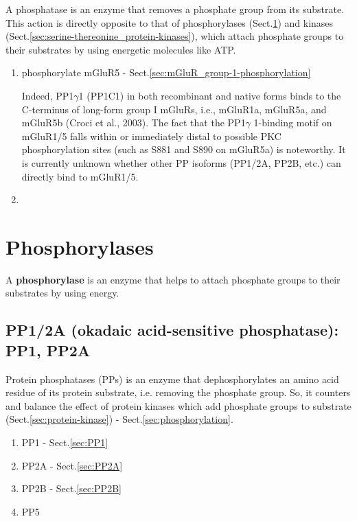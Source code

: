 A phosphatase is an enzyme that removes a phosphate group from its substrate.
This action is directly opposite to that of phosphorylases
(Sect.\ref{sec:phosphorylases}) and kinases
(Sect.\ref{sec:serine-thereonine_protein-kinases}), which attach phosphate
groups to their substrates by using energetic molecules like ATP.
\begin{enumerate}
  \item phosphorylate mGluR5 - Sect.\ref{sec:mGluR_group-1-phosphorylation}
 
Indeed, PP1$\gamma$1 (PP1C1) in both recombinant and native forms binds to the
C-terminus of long-form group I mGluRs, i.e., mGluR1a, mGluR5a, and mGluR5b
(Croci et al., 2003).
The fact that the PP1$\gamma$ 1-binding motif on mGluR1/5 falls within or
immediately distal to possible PKC phosphorylation sites (such as S881 and S890
on mGluR5a) is noteworthy. It is currently unknown whether other PP isoforms
(PP1/2A, PP2B, etc.) can directly bind to mGluR1/5.
 
  \item 
\end{enumerate}

\section{Phosphorylases}
\label{sec:phosphorylases}

A {\bf phosphorylase} is an enzyme that helps to attach phosphate groups to
their substrates by using energy.


\subsection{PP1/2A (okadaic acid-sensitive phosphatase): PP1, PP2A}
\label{sec:protein-phosphatase}

Protein phosphatases (PPs) is an enzyme that dephosphorylates an amino acid
residue of its protein substrate, i.e. removing the phosphate group. So, it
counters and balance the effect of protein kinases which add phosphate groups to
substrate (Sect.\ref{sec:protein-kinase}) - Sect.\ref{sec:phosphorylation}. 


\begin{enumerate}
  \item PP1 - Sect.\ref{sec:PP1}
  \item PP2A - Sect.\ref{sec:PP2A}
  \item PP2B - Sect.\ref{sec:PP2B}
  \item PP5
\end{enumerate}

